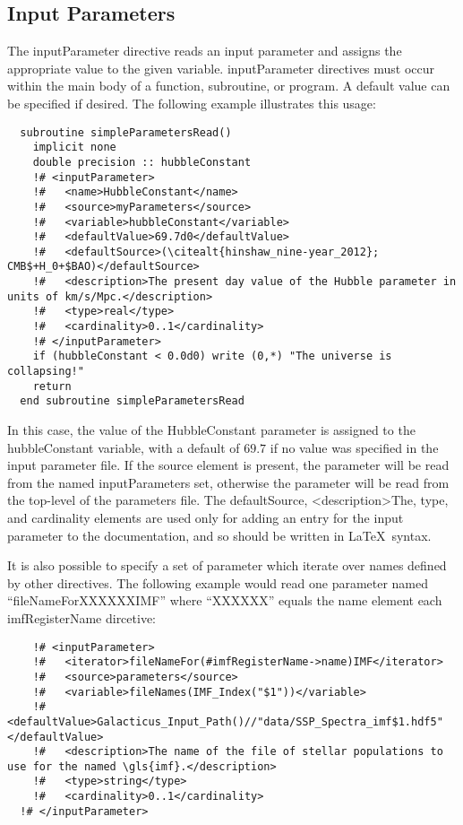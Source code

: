 \subsection{Input Parameters}

The {\normalfont \ttfamily inputParameter} directive reads an input parameter and assigns the appropriate value to the given variable. {\normalfont \ttfamily inputParameter} directives must occur within the main body of a function, subroutine, or program. A default value can be specified if desired. The following example illustrates this usage:

\begin{lstlisting}
  subroutine simpleParametersRead()
    implicit none
    double precision :: hubbleConstant
    !# <inputParameter>
    !#   <name>HubbleConstant</name>
    !#   <source>myParameters</source>
    !#   <variable>hubbleConstant</variable>
    !#   <defaultValue>69.7d0</defaultValue>
    !#   <defaultSource>(\citealt{hinshaw_nine-year_2012}; CMB$+H_0+$BAO)</defaultSource>
    !#   <description>The present day value of the Hubble parameter in units of km/s/Mpc.</description>
    !#   <type>real</type>
    !#   <cardinality>0..1</cardinality>
    !# </inputParameter>
    if (hubbleConstant < 0.0d0) write (0,*) "The universe is collapsing!"
    return
  end subroutine simpleParametersRead
\end{lstlisting}

In this case, the value of the {\normalfont \ttfamily HubbleConstant} parameter is assigned to the {\normalfont \ttfamily hubbleConstant} variable, with a default of $69.7$ if no value was specified in the input parameter file. If the {\normalfont \ttfamily source} element is present, the parameter will be read from the named {\normalfont \ttfamily inputParameters} set, otherwise the parameter will be read from the top-level of the parameters file. The {\normalfont \ttfamily defaultSource}, {\normalfont \ttfamily <description>The}, {\normalfont \ttfamily type}, and {\normalfont \ttfamily cardinality} elements are used only for adding an entry for the input parameter to the documentation, and so should be written in \LaTeX\ syntax.

It is also possible to specify a set of parameter which iterate over names defined by other directives. The following example would read one parameter named ``{\normalfont \ttfamily fileNameForXXXXXXIMF}'' where ``{\normalfont \ttfamily XXXXXX}'' equals the {\normalfont \ttfamily name} element each {\normalfont \ttfamily imfRegisterName} dircetive:
\begin{lstlisting}
    !# <inputParameter>
    !#   <iterator>fileNameFor(#imfRegisterName->name)IMF</iterator>
    !#   <source>parameters</source>
    !#   <variable>fileNames(IMF_Index("$1"))</variable>
    !#   <defaultValue>Galacticus_Input_Path()//"data/SSP_Spectra_imf$1.hdf5"</defaultValue>
    !#   <description>The name of the file of stellar populations to use for the named \gls{imf}.</description>
    !#   <type>string</type>
    !#   <cardinality>0..1</cardinality>
  !# </inputParameter>
\end{lstlisting}


